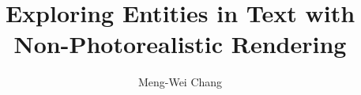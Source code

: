 \author{Meng-Wei Chang}
\title{Exploring Entities in Text with Non-Photorealistic Rendering}
 

 
%
\setcounter{tocdepth}{2}





\newcommand{\threed}{\textsc{3D} }
\newcommand{\twod}{\textsc{2D} }
\newcommand{\etal}{\emph{et~al}.\ }
\newcommand{\eg}{e.g.}
\newcommand{\ie}{i.e.} 
\newcommand{\daniel}[1]{\textcolor{magenta}{[dc] #1}}

\graphicspath{{./figures/}}

